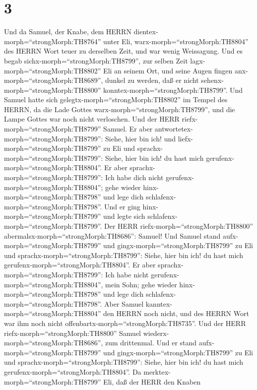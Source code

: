\hypertarget{section-2}{%
\section{3}\label{section-2}}

 Und da Samuel, der Knabe, dem HERRN
dientex-morph=``strongMorph:TH8764'' unter Eli,
warx-morph=``strongMorph:TH8804'' des HERRN Wort teuer zu derselben
Zeit, und war wenig Weissagung.  Und es begab
sichx-morph=``strongMorph:TH8799'', zur selben Zeit
lagx-morph=``strongMorph:TH8802'' Eli an seinem Ort, und seine Augen
fingen anx-morph=``strongMorph:TH8689'', dunkel zu werden, daß er nicht
sehenx-morph=``strongMorph:TH8800''
konntex-morph=``strongMorph:TH8799''.  Und Samuel hatte sich
gelegtx-morph=``strongMorph:TH8802'' im Tempel des HERRN, da die Lade
Gottes warx-morph=``strongMorph:TH8799'', und die Lampe Gottes war noch
nicht verloschen.  Und der HERR
riefx-morph=``strongMorph:TH8799'' Samuel. Er aber
antwortetex-morph=``strongMorph:TH8799'': Siehe, hier bin ich!
 und liefx-morph=``strongMorph:TH8799'' zu Eli und
sprachx-morph=``strongMorph:TH8799'': Siehe, hier bin ich! du hast mich
gerufenx-morph=``strongMorph:TH8804''. Er aber
sprachx-morph=``strongMorph:TH8799'': Ich habe dich nicht
gerufenx-morph=``strongMorph:TH8804''; gehe wieder
hinx-morph=``strongMorph:TH8798'' und lege dich
schlafenx-morph=``strongMorph:TH8798''. Und er ging
hinx-morph=``strongMorph:TH8799'' und legte sich
schlafenx-morph=``strongMorph:TH8799''.  Der HERR
riefx-morph=``strongMorph:TH8800''
abermalsx-morph=``strongMorph:TH8686'': Samuel! Und Samuel stand
aufx-morph=``strongMorph:TH8799'' und gingx-morph=``strongMorph:TH8799''
zu Eli und sprachx-morph=``strongMorph:TH8799'': Siehe, hier bin ich! du
hast mich gerufenx-morph=``strongMorph:TH8804''. Er aber
sprachx-morph=``strongMorph:TH8799'': Ich habe nicht
gerufenx-morph=``strongMorph:TH8804'', mein Sohn; gehe wieder
hinx-morph=``strongMorph:TH8798'' und lege dich
schlafenx-morph=``strongMorph:TH8798''.  Aber Samuel
kanntex-morph=``strongMorph:TH8804'' den HERRN noch nicht, und des HERRN
Wort war ihm noch nicht offenbartx-morph=``strongMorph:TH8735''.
 Und der HERR riefx-morph=``strongMorph:TH8800'' Samuel
wiederx-morph=``strongMorph:TH8686'', zum drittenmal. Und er stand
aufx-morph=``strongMorph:TH8799'' und gingx-morph=``strongMorph:TH8799''
zu Eli und sprachx-morph=``strongMorph:TH8799'': Siehe, hier bin ich! du
hast mich gerufenx-morph=``strongMorph:TH8804''. Da
merktex-morph=``strongMorph:TH8799'' Eli, daß der HERR den Knaben

